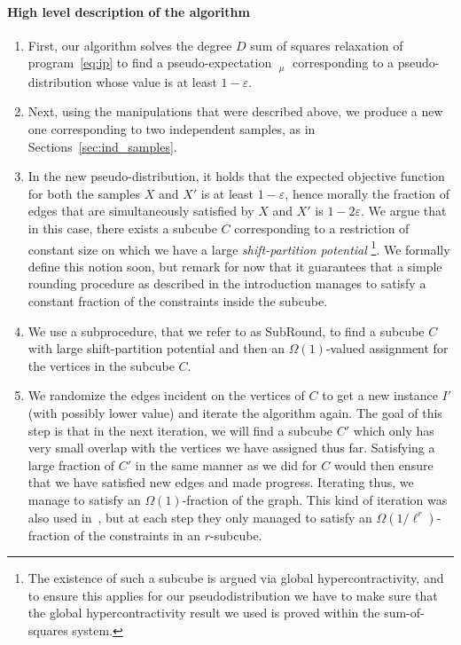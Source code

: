 \documentclass[11pt]{article}
\DeclareMathOperator*{\pE}{\widetilde{\mathbb{E}}}
\def \eps {{\varepsilon}}
\theoremstyle{definition}
\begin{document}
\paragraph{High level description of the algorithm}
\begin{enumerate}
    \item First, our algorithm solves the degree $D$ sum of squares relaxation of program~\eqref{eq:ip} to find a pseudo-expectation $\pE_{\mu}$ corresponding to a pseudo-distribution 
    whose value is at least $1-\eps$.
    \item Next, using the manipulations that were described above, we produce a new one corresponding to two independent samples, 
    as in Sections~\ref{sec:ind_samples}.
    \item In the new pseudo-distribution, it holds that the expected objective function for both the samples $X$ and $X'$ is at least $1-\eps$, hence morally the fraction of edges that are simultaneously satisfied by $X$ and $X'$ is $1-2\eps$. We argue that in this case, there exists a subcube $C$ corresponding to a restriction of constant size on 
    which we have a large \emph{shift-partition potential} \footnote{The existence 
    of such a subcube is argued via global hypercontractivity,
    and to ensure this applies for our pseudodistribution 
    we have to make sure that the global hypercontractivity 
    result we used is proved within the sum-of-squares 
    system.}. We formally define this notion soon, but remark for now that it guarantees that a simple rounding procedure as described in the introduction manages to satisfy a constant fraction of the constraints inside the subcube.
    \item We use a subprocedure, that we refer to as SubRound, to find a subcube $C$ with large shift-partition potential and then an $\Omega(1)$-valued assignment for the vertices in the subcube $C$.
    \item We randomize the edges incident on the vertices of $C$ to get a new instance $I'$ (with possibly lower value) 
    and iterate the algorithm again. The goal of this step is 
    that in the next iteration, we will find a subcube $C'$ 
    which only has very small overlap with the vertices we have assigned thus far. Satisfying a large fraction of $C'$ in the same manner as we did for $C$ would then ensure that we have satisfied new edges and made progress. Iterating thus, we manage to satisfy an $\Omega(1)$-fraction of the graph. This kind of iteration was also used in~\cite{BBKSS}, but at each step they only managed to satisfy an $\Omega(1/\ell^r)$-fraction of the constraints in an $r$-subcube.
\end{enumerate}
\end{document}
